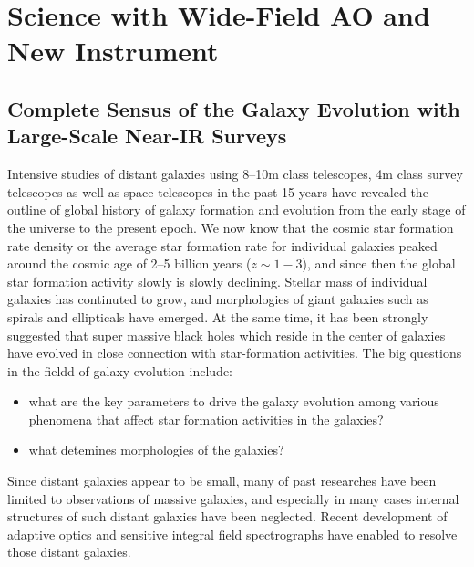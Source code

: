 \bigskip



\section{Science with Wide-Field AO and New Instrument}

\subsection{Complete Sensus of the Galaxy Evolution with Large-Scale
  Near-IR Surveys}

Intensive studies of distant galaxies using 8--10m class telescopes, 
4m class survey telescopes as well as space telescopes in the past 15
years have revealed the outline of global history of galaxy formation
and evolution from the early stage of the universe to the present
epoch. We now know that the cosmic star formation rate density or the
average star formation rate for individual galaxies peaked around the
cosmic age of 2--5 billion years ($z\sim1-3$), and since then the global
star formation activity slowly is slowly declining. Stellar mass of
individual galaxies has continuted to grow, and morphologies of giant
galaxies such as spirals and ellipticals have emerged. At the same time,
it has been strongly suggested that super massive black holes which
reside in the center of galaxies have evolved in close connection with
star-formation activities. 
The big questions in the fieldd of galaxy evolution include:
\begin{itemize}
 \item what are the key parameters to drive the galaxy evolution among
       various phenomena that affect star formation activities in the
       galaxies?
 \item what detemines morphologies of the galaxies?
\end{itemize}
Since distant galaxies appear to be small, many of past researches have
been limited to observations of massive galaxies, and especially in many
cases internal structures of such distant galaxies have been neglected. 
Recent development of adaptive optics and sensitive integral field
spectrographs have enabled to resolve those distant galaxies. 


